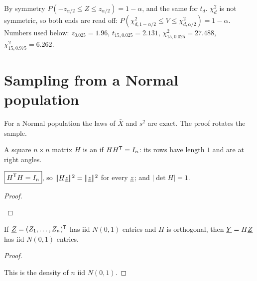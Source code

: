 By symmetry $P(-z_{\alpha/2}\le Z\le z_{\alpha/2})=1-\alpha$, and the same for $t_d$. $\chi^2_d$ is not symmetric, so both ends are read off: $P(\chi^2_{d,1-\alpha/2}\le V\le\chi^2_{d,\alpha/2})=1-\alpha$. Numbers used below: $z_{0.025}=1.96$, $t_{15,0.025}=2.131$, $\chi^2_{15,0.025}=27.488$, $\chi^2_{15,0.975}=6.262$.

\section{Sampling from a Normal population}

For a Normal population the laws of $\bar X$ and $s^2$ are exact. The proof rotates the sample.

\begin{definition}
A square $n\times n$ matrix $H$ is an  if $HH^{\mathsf{T}}=I_n$: its rows have length $1$ and are at right angles.
\end{definition}

\begin{lemma}
$\boxed{H^{\mathsf{T}} H=I_n}$, so $\|H\underline{z}\|^2=\|\underline{z}\|^2$ for every $\underline{z}$; and $|\det H|=1$.
\end{lemma}
\begin{proof}
\begin{deriv}
\end{deriv}
\end{proof}

\begin{lemma}
If $\underline{Z}=(Z_1,\dots,Z_n)^{\mathsf{T}}$ has iid $N(0,1)$ entries and $H$ is orthogonal, then $\underline{Y}=H\underline{Z}$ has iid $N(0,1)$ entries.
\end{lemma}
\begin{proof}
\begin{deriv}
\end{deriv}
This is the density of $n$ iid $N(0,1)$.
\end{proof}

